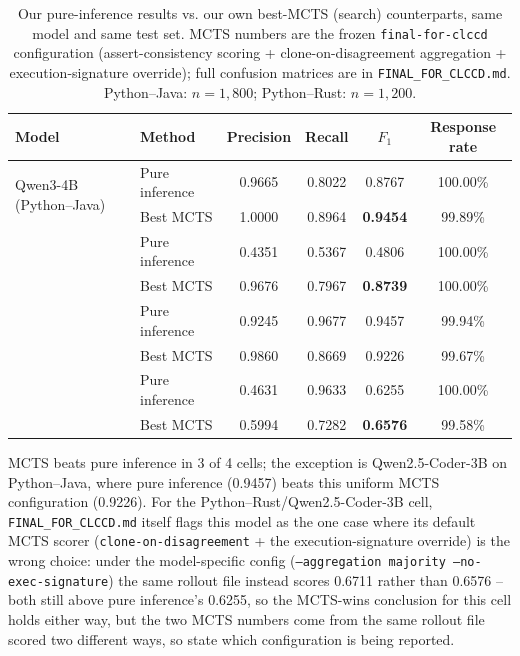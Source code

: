 \begin{table}[t]
\centering
\caption{Our pure-inference results vs. our own best-MCTS (search)
counterparts, same model and same test set. MCTS numbers are the frozen
\texttt{final-for-clccd} configuration (assert-consistency scoring +
clone-on-disagreement aggregation + execution-signature override); full
confusion matrices are in \texttt{FINAL\_FOR\_CLCCD.md}. Python--Java:
$n=1{,}800$; Python--Rust: $n=1{,}200$.}
\label{tab:pure-vs-mcts}
\begin{tabular}{llcccc}
\toprule
Model & Method & Precision & Recall & $F_1$ & Response rate \\
\midrule
\multirow{2}{*}{Qwen3-4B (Python--Java)}
 & Pure inference & 0.9665 & 0.8022 & 0.8767 & 100.00\% \\
 & Best MCTS       & 1.0000 & 0.8964 & \textbf{0.9454} & 99.89\%  \\
\addlinespace
\multirow{2}{*}{Qwen3-4B (Python--Rust)}
 & Pure inference & 0.4351 & 0.5367 & 0.4806 & 100.00\% \\
 & Best MCTS       & 0.9676 & 0.7967 & \textbf{0.8739} & 100.00\% \\
\addlinespace
\multirow{2}{*}{Qwen2.5-Coder-3B (Python--Java)}
 & Pure inference & 0.9245 & 0.9677 & 0.9457 & 99.94\%  \\
 & Best MCTS       & 0.9860 & 0.8669 & 0.9226 & 99.67\%  \\
\addlinespace
\multirow{2}{*}{Qwen2.5-Coder-3B (Python--Rust)}
 & Pure inference & 0.4631 & 0.9633 & 0.6255 & 100.00\% \\
 & Best MCTS       & 0.5994 & 0.7282 & \textbf{0.6576} & 99.58\%  \\
\bottomrule
\end{tabular}

\vspace{4pt}
{\footnotesize
MCTS beats pure inference in 3 of 4 cells; the exception is Qwen2.5-Coder-3B
on Python--Java, where pure inference (0.9457) beats this uniform MCTS
configuration (0.9226). For the Python--Rust/Qwen2.5-Coder-3B cell,
\texttt{FINAL\_FOR\_CLCCD.md} itself flags this model as the one case where
its default MCTS scorer (\texttt{clone-on-disagreement} + the
execution-signature override) is the wrong choice: under the
model-specific config (\texttt{--aggregation majority --no-exec-signature})
the same rollout file instead scores 0.6711 rather than 0.6576 -- both
still above pure inference's 0.6255, so the MCTS-wins conclusion for this
cell holds either way, but the two MCTS numbers come from the same rollout
file scored two different ways, so state which configuration is being
reported.}
\end{table}


